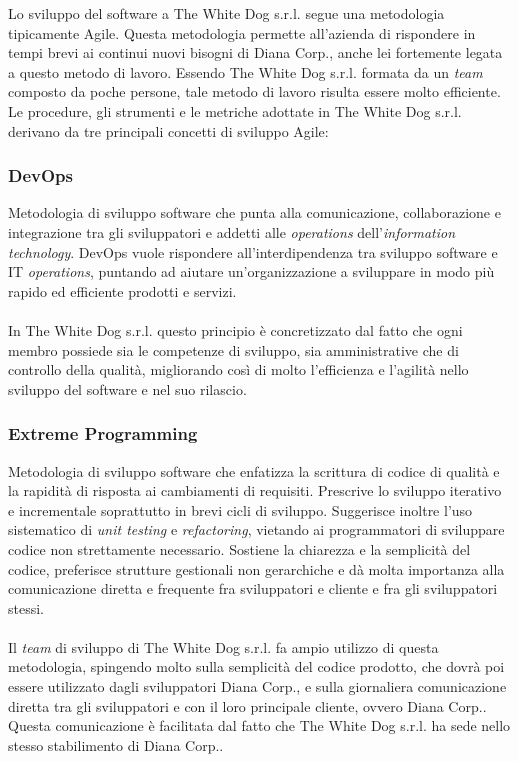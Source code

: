 Lo sviluppo del software a The White Dog s.r.l. segue una metodologia tipicamente Agile. Questa metodologia permette all'azienda di rispondere in tempi brevi ai continui nuovi bisogni di Diana Corp., anche lei fortemente legata a questo metodo di lavoro. Essendo The White Dog s.r.l. formata da un \textit{team} composto da poche persone, tale metodo di lavoro risulta essere molto efficiente. \\
Le procedure, gli strumenti e le metriche adottate in The White Dog s.r.l. derivano da tre principali concetti di sviluppo Agile:

\subsubsection{DevOps}

Metodologia di sviluppo software che punta alla comunicazione, collaborazione e integrazione tra gli sviluppatori e addetti alle \textit{operations} dell'\textit{information technology}. DevOps vuole rispondere all'interdipendenza tra sviluppo software e IT \textit{operations}, puntando ad aiutare un'organizzazione a sviluppare in modo più rapido ed efficiente prodotti e servizi. \\ \\
In The White Dog s.r.l. questo principio è concretizzato dal fatto che ogni membro possiede sia le competenze di sviluppo, sia amministrative che di controllo della qualità, migliorando così di molto l'efficienza e l'agilità nello sviluppo del software e nel suo rilascio.

\subsubsection{Extreme Programming}

Metodologia di sviluppo software che enfatizza la scrittura di codice di qualità e la rapidità di risposta ai cambiamenti di requisiti. Prescrive lo sviluppo iterativo e incrementale soprattutto in brevi cicli di sviluppo. Suggerisce inoltre l'uso sistematico di \textit{unit testing} e \textit{refactoring}, vietando ai programmatori di sviluppare codice non strettamente necessario. Sostiene la chiarezza e la semplicità del codice, preferisce strutture gestionali non gerarchiche e dà molta importanza  alla comunicazione diretta e frequente fra sviluppatori e cliente e fra gli sviluppatori stessi. \\ \\
Il \textit{team} di sviluppo di The White Dog s.r.l. fa ampio utilizzo di questa metodologia, spingendo molto sulla semplicità del codice prodotto, che dovrà poi essere utilizzato dagli sviluppatori Diana Corp., e sulla giornaliera comunicazione diretta tra gli sviluppatori e con il loro principale cliente, ovvero Diana Corp.. Questa comunicazione è facilitata dal fatto che The White Dog s.r.l. ha sede nello stesso stabilimento di Diana Corp..

